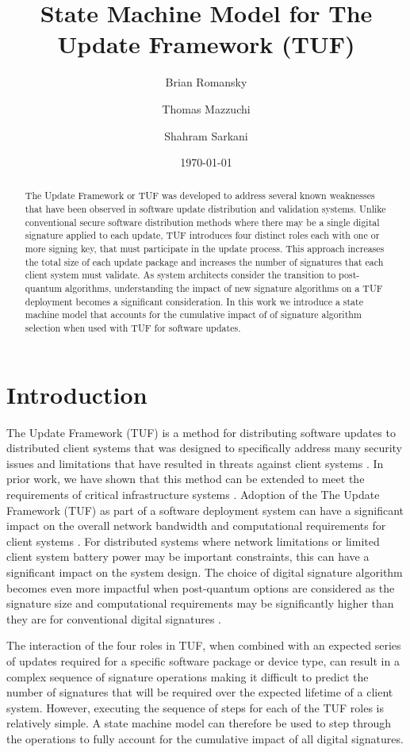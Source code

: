 \documentclass{article}
\title{State Machine Model for The Update Framework (TUF)}
\author{
  Brian Romansky \and
  Thomas Mazzuchi \and
  Shahram Sarkani
}
\date{\today}
\begin{document}
\maketitle

\begin{abstract}
The Update Framework or TUF was developed to address several known weaknesses that have been observed in software update distribution and validation systems.  Unlike conventional secure software distribution methods where there may be a single digital signature applied to each update, TUF introduces four distinct roles each with one or more signing key, that must participate in the update process.  This approach increases the total size of each update package and increases the number of signatures that each client system must validate.  As system architects consider the transition to post-quantum algorithms, understanding the impact of new signature algorithms on a TUF deployment becomes a significant consideration.  In this work we introduce a state machine model that accounts for the cumulative impact of of signature algorithm selection when used with TUF for software updates.
\end{abstract}


\section{Introduction}
The Update Framework (TUF) is a method for distributing software updates to distributed client systems that was designed to specifically address many security issues and limitations that have resulted in threats against client systems \cite{SamuelJustin2010Skci}.  In prior work, we have shown that this method can be extended to meet the requirements of critical infrastructure systems \cite{RomanskyBrian2024ETUF}.  Adoption of the The Update Framework (TUF) as part of a software deployment system can have a significant impact on the overall network bandwidth and computational requirements for client systems \cite{LMS-v-XMSS}.  For distributed systems where network limitations or limited client system battery power may be important constraints, this can have a significant impact on the system design.  The choice of digital signature algorithm becomes even more impactful when post-quantum options are considered as the signature size and computational requirements may be significantly higher than they are for conventional digital signatures \cite{NSA-CNSA-2022r2}.

The interaction of the four roles in TUF, when combined with an expected series of updates required for a specific software package or device type, can result in a complex sequence of signature operations making it difficult to predict the number of signatures that will be required over the expected lifetime of a client system.  However, executing the sequence of steps for each of the TUF roles is relatively simple.  A state machine model can therefore be used to step through the operations to fully account for the cumulative impact of all digital signatures.
\end{document}
